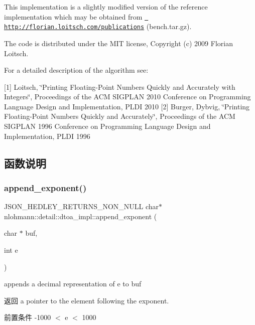 This implementation is a slightly modified version of the reference implementation which may be obtained from \href{http://florian.loitsch.com/publications}{\texttt{ http\+://florian.\+loitsch.\+com/publications}} (bench.\+tar.\+gz).

The code is distributed under the M\+IT license, Copyright (c) 2009 Florian Loitsch.

For a detailed description of the algorithm see\+:

\mbox{[}1\mbox{]} Loitsch, \char`\"{}\+Printing Floating-\/\+Point Numbers Quickly and Accurately with
    Integers\char`\"{}, Proceedings of the A\+CM S\+I\+G\+P\+L\+AN 2010 Conference on Programming Language Design and Implementation, P\+L\+DI 2010 \mbox{[}2\mbox{]} Burger, Dybvig, \char`\"{}\+Printing Floating-\/\+Point Numbers Quickly and Accurately\char`\"{}, Proceedings of the A\+CM S\+I\+G\+P\+L\+AN 1996 Conference on Programming Language Design and Implementation, P\+L\+DI 1996 

\subsection{函数说明}
\mbox{\label{namespacenlohmann_1_1detail_1_1dtoa__impl_ad90f19ed10d8133b727df4b9bc5ddf5c}} 
\subsubsection{\texorpdfstring{append\_exponent()}{append\_exponent()}}
{\footnotesize\ttfamily J\+S\+O\+N\+\_\+\+H\+E\+D\+L\+E\+Y\+\_\+\+R\+E\+T\+U\+R\+N\+S\+\_\+\+N\+O\+N\+\_\+\+N\+U\+LL char$\ast$ nlohmann\+::detail\+::dtoa\+\_\+impl\+::append\+\_\+exponent (\begin{DoxyParamCaption}\item[{char $\ast$}]{buf,  }\item[{int}]{e }\end{DoxyParamCaption})\hspace{0.3cm}{\ttfamily [inline]}}



appends a decimal representation of e to buf 

\begin{DoxyReturn}{返回}
a pointer to the element following the exponent. 
\end{DoxyReturn}
\begin{DoxyPrecond}{前置条件}
-\/1000 $<$ e $<$ 1000 
\end{DoxyPrecond}
\mbox{\label{namespacenlohmann_1_1detail_1_1dtoa__impl_a22b6e37654ac93c6d0d9c06ec1bf5ded}} 
